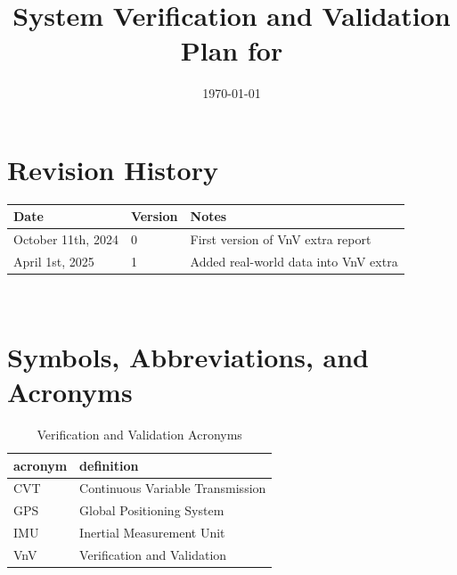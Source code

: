 \documentclass[12pt, titlepage]{article}
\begin{document}
\title{System Verification and Validation Plan for \progname{}} 
\author{\authname}
\date{\today}
	
\maketitle


\section*{Revision History}

\begin{tabularx}{\textwidth}{p{3cm}p{2cm}X}
\toprule {\bf Date} & {\bf Version} & {\bf Notes}\\
\midrule
October 11th, 2024 & 0 & First version of VnV extra report\\
April 1st, 2025 & 1 & Added real-world data into VnV extra\\
\bottomrule
\end{tabularx}

~\\

\newpage

\tableofcontents

\listoftables


\listoffigures


\newpage

\section{Symbols, Abbreviations, and Acronyms}

\begin{table}[h]
  \raggedright
  \begin{tabular}{l l} 
    \toprule		
    \textbf{acronym} & \textbf{definition}\\
    \midrule
    CVT & Continuous Variable Transmission\\
    GPS & Global Positioning System\\
    IMU & Inertial Measurement Unit\\
    VnV & Verification and Validation\\
    \bottomrule
  \end{tabular}
  \caption{Verification and Validation Acronyms}
  \label{tab:vnv_acronyms}
\end{table}

\newpage
\end{document}
